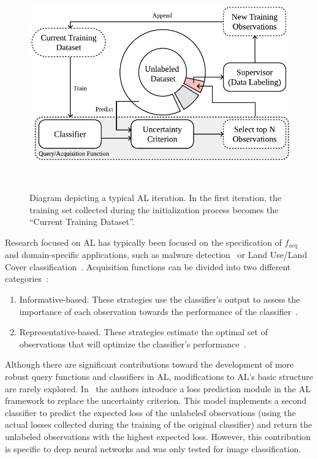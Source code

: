 \documentclass[parskip=full]{scrartcl}
\begin{document}
\begin{figure}
	\centering
	\includegraphics[width=.6\linewidth]{../analysis/al_iteration}
    \caption{%
        Diagram depicting a typical AL iteration. In the first iteration, the
        training set collected during the initialization process becomes the
        ``Current Training Dataset''.
    }~\label{fig:al_iteration}
\end{figure}

Research focused on AL has typically been focused on the specification of
$f_{acq}$~\cite{hospedales2011finding} and domain-specific applications, such
as malware detection~\cite{li2022boosting} or Land Use/Land Cover
classification~\cite{li2020label}. Acquisition functions can be divided into
two different categories~\cite{su2021cost, Kumar2020}: 

\begin{enumerate}

    \item Informative-based. These strategies use the classifier's output to
        assess the importance of each observation towards the performance of
        the classifier~\cite{Fu2013}.

    \item Representative-based. These strategies estimate the optimal set of
        observations that will optimize the classifier's
        performance~\cite{Kumar2020}.

\end{enumerate}

Although there are significant contributions toward the development of more
robust query functions and classifiers in AL, modifications to AL's basic
structure are rarely explored. In~\cite{Yoo2019} the authors introduce a loss
prediction module in the AL framework to replace the uncertainty criterion.
This model implements a second classifier to predict the expected loss of the
unlabeled observations (using the actual losses collected during the training
of the original classifier) and return the unlabeled observations with the
highest expected loss. However, this contribution is specific to deep neural
networks and was only tested for image classification.
\end{document}
